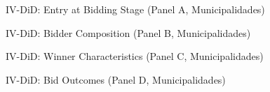 \documentclass[9pt,aspectratio=169]{beamer}
\begin{document}



\begin{frame}{IV-DiD: Entry at Bidding Stage (Panel A, Municipalidades)}
\small\medskip

\end{frame}

\begin{frame}{IV-DiD: Bidder Composition (Panel B, Municipalidades)}
\small\medskip

\end{frame}

\begin{frame}{IV-DiD: Winner Characteristics (Panel C, Municipalidades)}
\small\medskip

\end{frame}

\begin{frame}{IV-DiD: Bid Outcomes (Panel D, Municipalidades)}
\small\medskip

\end{frame}
\end{document}
